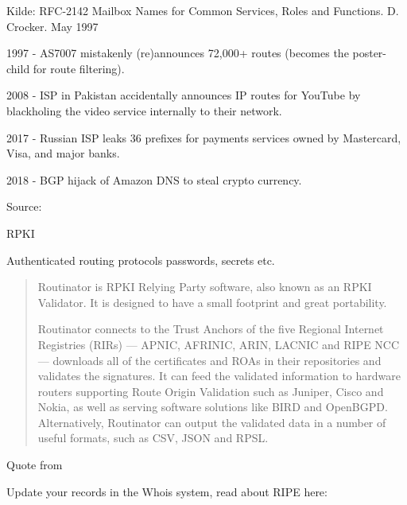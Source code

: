 \documentclass[Screen16to9,17pt]{foils}
\begin{document}
Kilde:
RFC-2142 Mailbox Names for Common Services, Roles and Functions. D.
Crocker. May 1997




{\small{}}



\begin{list2}
\item 1997 - AS7007 mistakenly (re)announces 72,000+ routes (becomes the poster-child for route filtering).
\item 2008 - ISP in Pakistan accidentally announces IP routes for YouTube by blackholing the video service internally to their network.
\item 2017 - Russian ISP leaks 36 prefixes for payments services owned by Mastercard, Visa, and major banks.
\item 2018 - BGP hijack of Amazon DNS to steal crypto currency.
\end{list2}
Source: 

\begin{list1}
\item RPKI 
\item Authenticated routing protocols passwords, secrets etc.
\end{list1}


\begin{quote}
  Routinator is RPKI Relying Party software, also known as an RPKI Validator. It is designed to have a small footprint and great portability.

Routinator connects to the Trust Anchors of the five Regional Internet Registries (RIRs) — APNIC, AFRINIC, ARIN, LACNIC and RIPE NCC — downloads all of the certificates and ROAs in their repositories and validates the signatures. It can feed the validated information to hardware routers supporting Route Origin Validation such as Juniper, Cisco and Nokia, as well as serving software solutions like BIRD and OpenBGPD. Alternatively, Routinator can output the validated data in a number of useful formats, such as CSV, JSON and RPSL.
\end{quote}

\begin{list1}
\item Quote from {\small{}}
\item Update your records in the Whois system, read about RIPE here:\\ {\small{}}
\end{list1}
\end{document}
